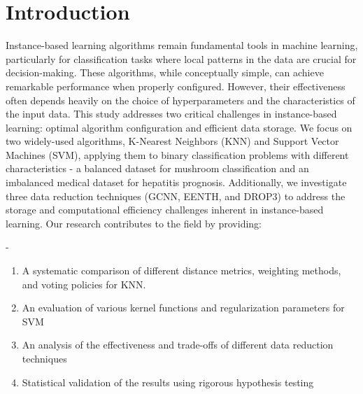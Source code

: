 \section{Introduction}
Instance-based learning algorithms remain fundamental tools in machine learning, particularly for classification tasks where local patterns in the data are crucial for decision-making. These algorithms, while conceptually simple, can achieve remarkable performance when properly configured. However, their effectiveness often depends heavily on the choice of hyperparameters and the characteristics of the input data.
This study addresses two critical challenges in instance-based learning: optimal algorithm configuration and efficient data storage. We focus on two widely-used algorithms, K-Nearest Neighbors (KNN) and Support Vector Machines (SVM), applying them to binary classification problems with different characteristics - a balanced dataset for mushroom classification and an imbalanced medical dataset for hepatitis prognosis. Additionally, we investigate three data reduction techniques (GCNN, EENTH, and DROP3) to address the storage and computational efficiency challenges inherent in instance-based learning.
Our research contributes to the field by providing:

-
\begin{enumerate}
	\item A systematic comparison of different distance metrics, weighting methods, and voting policies for KNN.
	\item An evaluation of various kernel functions and regularization parameters for SVM
	\item An analysis of the effectiveness and trade-offs of different data reduction techniques
	\item Statistical validation of the results using rigorous hypothesis testing
\end{enumerate}
